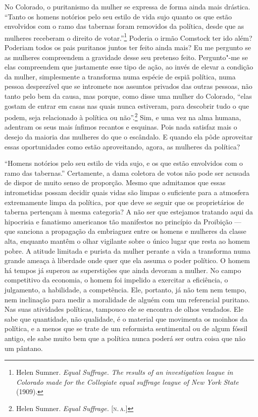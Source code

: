 No Colorado, o puritanismo da mulher se expressa de forma ainda mais
drástica. ``Tanto os homens notórios pelo seu estilo de vida sujo
quanto os que estão envolvidos com o ramo das tabernas foram removidos
da política, desde que as mulheres receberam o direito de
votar.''\footnote{Helen Sumner. \emph{Equal Suffrage. The results of an
  investigation league in Colorado made for the Collegiate equal
  suffrage league of New York State} (1909).} Poderia o irmão Comstock
ter ido além? Poderiam todos os pais puritanos juntos ter feito ainda mais? Eu
me pergunto se as mulheres compreendem a gravidade desse seu pretenso
feito. Pergunto"-me se elas compreendem que justamente esse tipo de ação, ao
invés de elevar a condição da mulher, simplesmente a transforma numa
espécie de espiã política, numa pessoa desprezível que se intromete nos
assuntos privados das outras pessoas, não tanto pelo bem da causa, mas
porque, como disse uma mulher do Colorado, ``elas gostam de entrar em
casas nas quais nunca estiveram, para descobrir tudo o que podem, seja
relacionado à política ou não''.\footnote{Helen Sumner. \emph{Equal
  Suffrage.} [\textsc{n.\,a.}]} Sim, e uma vez na alma humana, adentram os seus
mais ínfimos recantos e esquinas. Pois nada satisfaz mais o desejo da maioria das
mulheres do que o escândalo. E quando ela pôde aproveitar essas
oportunidades como estão aproveitando, agora, as mulheres da política?

``Homens notórios pelo seu estilo de vida sujo, e os que estão
envolvidos com o ramo das tabernas.'' Certamente, a dama coletora de
votos não pode ser acusada de dispor de muito senso de proporção. Mesmo
que admitamos que essas intrometidas possam decidir quais vidas são
limpas o suficiente para a atmosfera extremamente limpa da política, por
que deve se seguir que os proprietários de taberna pertençam à mesma
categoria? A não ser que estejamos tratando aqui da hipocrisia e
fanatismo americanos tão manifestos no princípio da Proibição
--- que sanciona a propagação da embriaguez entre os
homens e mulheres da classe alta, enquanto mantêm o olhar vigilante
sobre o único lugar que resta ao homem pobre. A atitude limitada e
purista da mulher perante a vida a transforma numa grande ameaça à
liberdade onde quer que ela assuma o poder político. O homem há tempos
já superou as superstições que ainda devoram a mulher. No campo
competitivo da economia, o homem foi impelido a exercitar a eficiência,
o julgamento, a habilidade, a competência. Ele, portanto, já não tem nem
tempo, nem inclinação para medir a moralidade de alguém com um
referencial puritano. Nas suas atividades políticas, tampouco ele se encontra de olhos vendados. Ele sabe que quantidade, não qualidade, é o material
que movimenta os moinhos da política, e a menos que se trate de um
reformista sentimental ou de algum fóssil antigo, ele sabe muito bem que
a política nunca poderá ser outra coisa que não um pântano.

